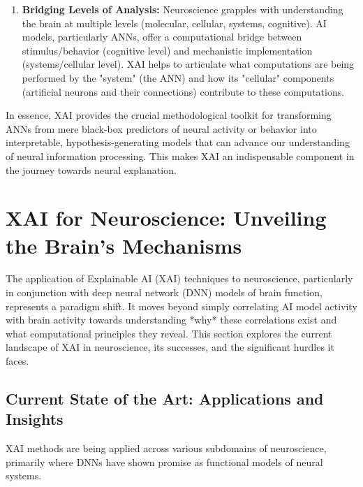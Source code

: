 \documentclass[11pt,a4paper]{article}
\begin{document}
\begin{enumerate}
    \item \textbf{Bridging Levels of Analysis:} Neuroscience grapples with understanding the brain at multiple levels (molecular, cellular, systems, cognitive). AI models, particularly ANNs, offer a computational bridge between stimulus/behavior (cognitive level) and mechanistic implementation (systems/cellular level). XAI helps to articulate what computations are being performed by the "system" (the ANN) and how its "cellular" components (artificial neurons and their connections) contribute to these computations.
\end{enumerate}
In essence, XAI provides the crucial methodological toolkit for transforming ANNs from mere black-box predictors of neural activity or behavior into interpretable, hypothesis-generating models that can advance our understanding of neural information processing. This makes XAI an indispensable component in the journey towards neural explanation.

\section{XAI for Neuroscience: Unveiling the Brain's Mechanisms}

The application of Explainable AI (XAI) techniques to neuroscience, particularly in conjunction with deep neural network (DNN) models of brain function, represents a paradigm shift. It moves beyond simply correlating AI model activity with brain activity towards understanding *why* these correlations exist and what computational principles they reveal. This section explores the current landscape of XAI in neuroscience, its successes, and the significant hurdles it faces.

\subsection{Current State of the Art: Applications and Insights}

XAI methods are being applied across various subdomains of neuroscience, primarily where DNNs have shown promise as functional models of neural systems.
\end{document}
